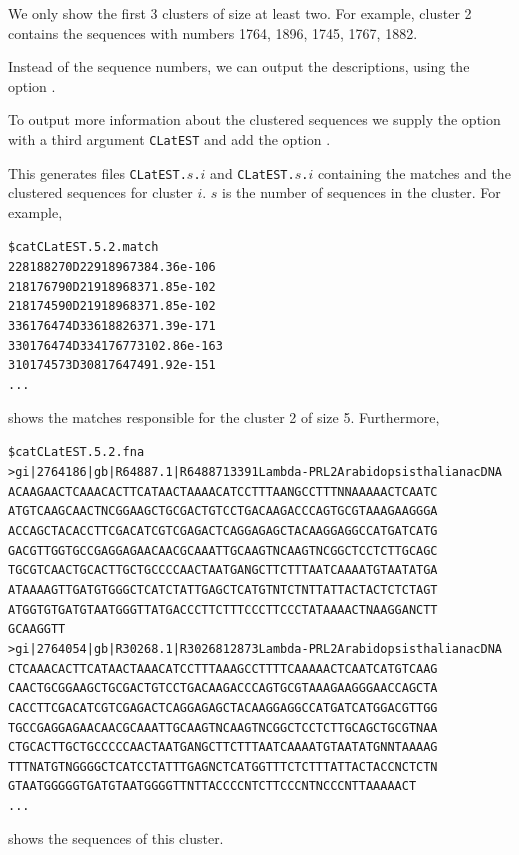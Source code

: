 \documentclass[12pt,titlepage]{article}
\newcommand{\EXECUTE}[1]{}
\newenvironment{Output}{%
\begin{scriptsize}
\begin{alltt}}{%
\end{alltt}
\end{scriptsize}%
\addvspace{-\medskipamount}
}
\begin{document}
\begin{AboutVmatch}
\EXECUTE{vmatch -dbcluster 30 50 -p -d -l 200 -e 10 atEST | head -n 15}

We only show the first 3 clusters of size at least two. For example,
cluster 2 contains the sequences with numbers
1764, 1896, 1745, 1767, 1882.

Instead of the sequence numbers, we can output the descriptions,
using the option .

\EXECUTE{vmatch -dbcluster 30 50 -p -d -l 200 -e 10 -showdesc 0 atEST | head -n 22}

To output more information about the clustered sequences we supply the
option  with a third argument \texttt{CLatEST} and
add the option . 

\EXECUTE{vmatch -dbcluster 30 50 CLatEST -s -p -d -l 200 -e 10 atEST | head -n 12}

This generates files 
\texttt{CLatEST.}$s$\texttt{.}$i$ and
\texttt{CLatEST.}$s$\texttt{.}$i$ containing the 
matches and the clustered
sequences for cluster \(i\). $s$ is the number of sequences in the
cluster. For example, 

\begin{Output}
\$ cat CLatEST.5.2.match
  228    1882     70   D   229    1896     73   8   4.36e-106
  218    1767     90   D   219    1896     83   7   1.85e-102
  218    1745     90   D   219    1896     83   7   1.85e-102
  336    1764     74   D   336    1882     63   7   1.39e-171
  330    1764     74   D   334    1767     73  10   2.86e-163
  310    1745     73   D   308    1764     74   9   1.92e-151
...
\end{Output}
shows the matches responsible for the cluster 2 of size 5. Furthermore,

\begin{Output}
\$ cat CLatEST.5.2.fna
>gi|2764186|gb|R64887.1|R64887 13391 Lambda-PRL2 Arabidopsis thaliana cDNA
ACAAGAACTCAAACACTTCATAACTAAAACATCCTTTAANGCCTTTNNAAAAACTCAATC
ATGTCAAGCAACTNCGGAAGCTGCGACTGTCCTGACAAGACCCAGTGCGTAAAGAAGGGA
ACCAGCTACACCTTCGACATCGTCGAGACTCAGGAGAGCTACAAGGAGGCCATGATCATG
GACGTTGGTGCCGAGGAGAACAACGCAAATTGCAAGTNCAAGTNCGGCTCCTCTTGCAGC
TGCGTCAACTGCACTTGCTGCCCCAACTAATGANGCTTCTTTAATCAAAATGTAATATGA
ATAAAAGTTGATGTGGGCTCATCTATTGAGCTCATGTNTCTNTTATTACTACTCTCTAGT
ATGGTGTGATGTAATGGGTTATGACCCTTCTTTCCCTTCCCTATAAAACTNAAGGANCTT
GCAAGGTT
>gi|2764054|gb|R30268.1|R30268 12873 Lambda-PRL2 Arabidopsis thaliana cDNA
CTCAAACACTTCATAACTAAACATCCTTTAAAGCCTTTTCAAAAACTCAATCATGTCAAG
CAACTGCGGAAGCTGCGACTGTCCTGACAAGACCCAGTGCGTAAAGAAGGGAACCAGCTA
CACCTTCGACATCGTCGAGACTCAGGAGAGCTACAAGGAGGCCATGATCATGGACGTTGG
TGCCGAGGAGAACAACGCAAATTGCAAGTNCAAGTNCGGCTCCTCTTGCAGCTGCGTNAA
CTGCACTTGCTGCCCCCAACTAATGANGCTTCTTTAATCAAAATGTAATATGNNTAAAAG
TTTNATGTNGGGGCTCATCCTATTTGAGNCTCATGGTTTCTCTTTATTACTACCNCTCTN
GTAATGGGGGTGATGTAATGGGGTTNTTACCCCNTCTTCCCNTNCCCNTTAAAAACT
...
\end{Output}
shows the sequences of this cluster.


\end{AboutVmatch}
\end{document}

